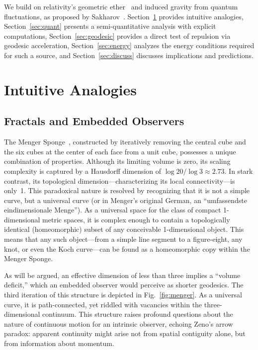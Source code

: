 \documentclass[%
  reprint,
  superscriptaddress,
  showpacs,
  showkeys,
  amsmath,amssymb,
  pra,
  longbibliography,
  floatfix,
  x11names
]{revtex4-2}
\begin{document}
We build on relativity's geometric ether~\cite{einstein-aether-en,dirac-aether} and induced gravity from quantum fluctuations, as proposed by Sakharov~\cite{Sakharov-67}. Section~\ref{sec:intuitive} provides intuitive analogies, Section~\ref{sec:quant} presents a semi-quantitative analysis with explicit computations, Section~\ref{sec:geodesic} provides a direct test of repulsion via geodesic acceleration, Section~\ref{sec:energy} analyzes the energy conditions required for such a source, and Section~\ref{sec:discuss} discusses implications and predictions.

\section{Intuitive Analogies}
\label{sec:intuitive}

\subsection{Fractals and Embedded Observers}

The Menger Sponge~\cite{Menger1926a_reprint,Menger1926b_reprint,Edgar_ClassicsOnFractals},
constructed by iteratively removing the central cube and the six cubes at the center of each face from a unit cube,
possesses a unique combination of properties.
Although its limiting volume is zero, its scaling complexity is captured by a Hausdorff dimension of $\log 20 / \log 3 \approx 2.73$.
In stark contrast, its topological dimension---characterizing its local connectivity---is only~1.
This paradoxical nature is resolved by recognizing that it is not a simple curve,
but a  {universal curve} (or in Menger's original German, an ``umfassendste eindimensionale Menge'').
 As a universal space for the class of compact 1-dimensional metric spaces,
it is complex enough to contain a topologically identical (homeomorphic) subset of any conceivable 1-dimensional object.
This means that any such object---from a simple line segment to a figure-eight, any knot,
or even the Koch curve---can be found as a homeomorphic copy within the Menger Sponge.


As will be argued, an effective dimension of less than three implies a ``volume deficit,'' which an embedded observer would perceive as shorter geodesics. The third iteration of this structure is depicted in Fig.~\ref{fig:menger}. As a {universal curve}, it is path-connected, yet riddled with vacancies within the three-dimensional continuum. This structure raises profound questions about the nature of continuous motion for an intrinsic observer, echoing Zeno's arrow paradox: apparent continuity might arise not from spatial contiguity alone, but from information about momentum.
\end{document}
